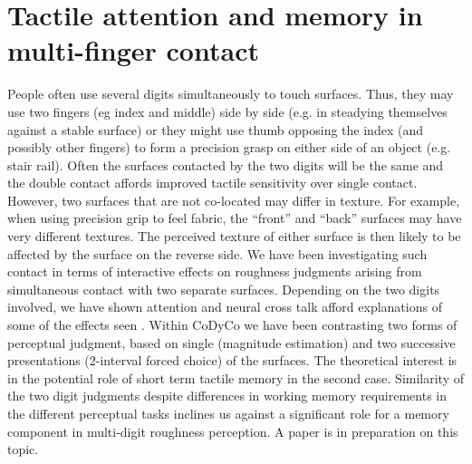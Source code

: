 \section {Tactile attention and memory in multi-finger contact}
People often use several digits simultaneously to touch surfaces. Thus, they may use two fingers (eg index and middle) side by side (e.g. in steadying themselves against a stable surface) or they might use thumb opposing the index (and possibly other fingers) to form a precision grasp on either side of an object (e.g. stair rail). Often the surfaces contacted by the two digits will be the same and the double contact affords improved tactile sensitivity over single contact. However, two surfaces that are not co-located may differ in texture. For example, when using precision grip to feel fabric, the “front” and “back” surfaces may have very different textures. The perceived texture of either surface is then likely to be affected by the surface on the reverse side. We have been investigating such contact in terms of interactive effects on roughness judgments arising from simultaneous contact with two separate surfaces. Depending on the two digits involved, we have shown attention and neural cross talk afford explanations of some of the effects seen \cite{roberts2010, roberts2013}. Within CoDyCo we have been contrasting two forms of perceptual judgment, based on single (magnitude estimation) and two successive presentations (2-interval forced choice) of the surfaces. The theoretical interest is in the potential role of short term tactile memory in the second case. Similarity of the two digit judgments despite differences in working memory requirements in the different perceptual tasks inclines us against a significant role for a memory component in multi-digit roughness perception. A paper is in preparation on this topic. 

